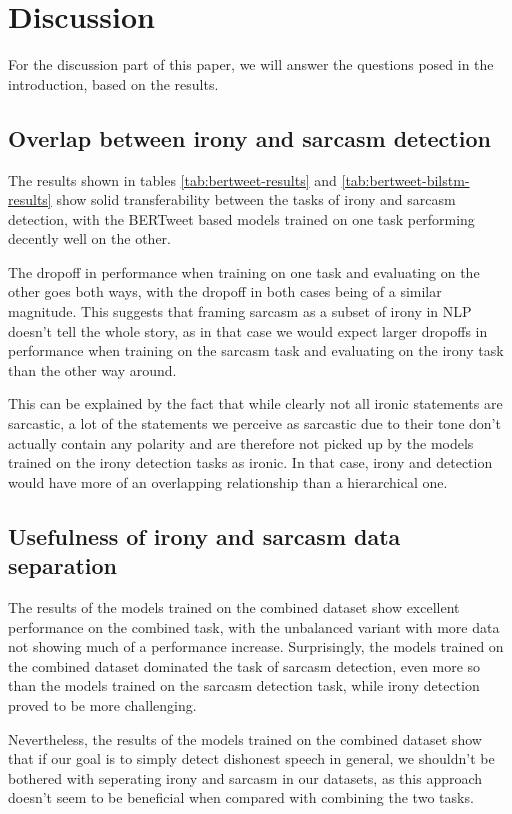 \documentclass[10pt, a4paper]{article}
\begin{document}
\section{Discussion}\label{discussion}
For the discussion part of this paper, we will answer the questions posed in the introduction, based on the results.

\subsection{Overlap between irony and sarcasm detection}
The results shown in tables \ref{tab:bertweet-results} and \ref{tab:bertweet-bilstm-results} show solid transferability between 
the tasks of irony and sarcasm detection, with the BERTweet based models trained on one task performing decently well on the other.

The dropoff in performance when training on one task and evaluating on the other goes both ways, with the dropoff in both cases 
being of a similar magnitude. This suggests that framing sarcasm as a subset of irony in NLP doesn't tell the whole story, as
in that case we would expect larger dropoffs in performance when training on the sarcasm task and evaluating on the irony task than
the other way around.

This can be explained by the fact that while clearly not all ironic statements are sarcastic, a lot of the statements we perceive 
as sarcastic due to their tone don't actually contain any polarity and are therefore not picked up by the models trained on the
irony detection tasks as ironic. In that case, irony and detection would have more of an overlapping relationship than a hierarchical
one.

\subsection{Usefulness of irony and sarcasm data separation}
The results of the models trained on the combined dataset show excellent performance on the combined task, with the unbalanced 
variant with more data not showing much of a performance increase. Surprisingly, the models trained on the combined dataset dominated
the task of sarcasm detection, even more so than the models trained on the sarcasm detection task, while irony detection proved to be more
challenging.

Nevertheless, the results of the models trained on the combined dataset show that if our goal is to simply detect dishonest speech in
general, we shouldn't be bothered with seperating irony and sarcasm in our datasets, as this approach doesn't seem to be beneficial
when compared with combining the two tasks.
\end{document}
